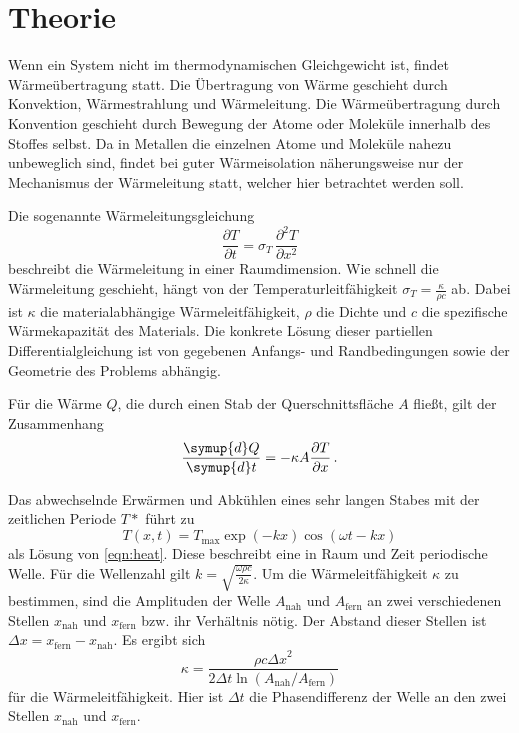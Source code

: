 \section{Theorie}
\label{sec:Theorie}
Wenn ein System nicht im thermodynamischen Gleichgewicht ist, findet Wärmeübertragung statt.
Die Übertragung von Wärme geschieht durch Konvektion, Wärmestrahlung und Wärmeleitung.
Die Wärmeübertragung durch Konvention geschieht durch Bewegung der Atome oder
Moleküle innerhalb des Stoffes selbst. Da in Metallen die einzelnen Atome und
Moleküle nahezu unbeweglich sind, findet bei guter Wärmeisolation näherungsweise
nur der Mechanismus der Wärmeleitung statt, welcher hier betrachtet werden soll.

Die sogenannte Wärmeleitungsgleichung
\begin{equation}
  \dfrac{\partial T}{\partial t} = \sigma_T \, \dfrac{\partial^2 T}{\partial x^2}
  \label{eqn:heat}
\end{equation}
beschreibt die Wärmeleitung in einer Raumdimension. Wie schnell die Wärmeleitung
geschieht, hängt von der Temperaturleitfähigkeit $\sigma_T = \frac{\kappa}{\rho c}$
ab. Dabei ist $\kappa$ die materialabhängige Wärmeleitfähigkeit, $\rho$ die Dichte
und $c$ die spezifische Wärmekapazität des Materials. Die konkrete Lösung dieser
partiellen Differentialgleichung ist von gegebenen Anfangs- und Randbedingungen sowie
der Geometrie des Problems abhängig.

Für die Wärme $Q$, die durch einen Stab der Querschnittsfläche $A$ fließt, gilt
der Zusammenhang
\begin{equation}
  \dfrac{\symup{d} Q}{\symup{d} t} = - \kappa A \dfrac{\partial T}{\partial x}\,.
  \label{eqn:waerme}
\end{equation}

Das abwechselnde Erwärmen und Abkühlen eines sehr langen Stabes mit der zeitlichen
Periode $T*$ führt zu
\begin{equation}
  T(x,t) = T_\text{max} \exp(-kx) \cos(\omega t - kx)
  \label{eqn:tempwelle}
\end{equation}
als Lösung von \eqref{eqn:heat}. Diese beschreibt eine in Raum und Zeit periodische
Welle. Für die Wellenzahl gilt $k = \sqrt{\frac{\omega \rho c}{2 \kappa}}$.
Um die Wärmeleitfähigkeit $\kappa$ zu bestimmen, sind die Amplituden der Welle
$A_\text{nah}$ und $A_\text{fern}$ an zwei verschiedenen Stellen $x_\text{nah}$
und $x_\text{fern}$ bzw. ihr Verhältnis nötig. Der Abstand dieser Stellen ist
$\Delta x = x_\text{fern} - x_\text{nah}$. Es ergibt sich
\begin{equation}
  \kappa = \frac{\rho c {\Delta x}^2}{2 \Delta t \ln \left(A_\text{nah}/A_\text{fern}\right)}
  \label{eqn:kappa}
\end{equation}
für die Wärmeleitfähigkeit. Hier ist $\Delta t$ die Phasendifferenz der Welle
an den zwei Stellen $x_\text{nah}$ und $x_\text{fern}$.
